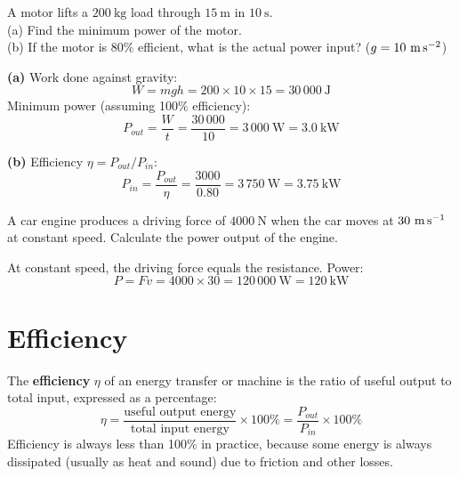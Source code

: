 \begin{examplebox}[5.5]
A motor lifts a $200\ \text{kg}$ load through
$15\ \text{m}$ in $10\ \text{s}$.\\
(a) Find the minimum power of the motor.\\
(b) If the motor is $80\%$ efficient, what is the
actual power input?
($g = 10\ \text{m\,s}^{-2}$)
\end{examplebox}

\begin{solutionbox}
\textbf{(a)} Work done against gravity:
\[
  W = mgh = 200 \times 10 \times 15 = 30\,000\ \text{J}
\]
Minimum power (assuming 100\% efficiency):
\[
  P_{out} = \frac{W}{t} = \frac{30\,000}{10}
  = 3\,000\ \text{W} = 3.0\ \text{kW}
\]

\textbf{(b)} Efficiency $\eta = P_{out}/P_{in}$:
\[
  P_{in} = \frac{P_{out}}{\eta}
  = \frac{3000}{0.80} = 3\,750\ \text{W} = 3.75\ \text{kW}
\]
\end{solutionbox}

\begin{examplebox}[5.6]
A car engine produces a driving force of $4000\ \text{N}$
when the car moves at $30\ \text{m\,s}^{-1}$ at constant
speed. Calculate the power output of the engine.
\end{examplebox}

\begin{solutionbox}
At constant speed, the driving force equals the
resistance. Power:
\[
  P = Fv = 4000 \times 30 = 120\,000\ \text{W}
  = 120\ \text{kW}
\]
\end{solutionbox}

\section{Efficiency}

\begin{definitionbox}[Efficiency]
The \textbf{efficiency} $\eta$ of an energy transfer
or machine is the ratio of useful output to total input,
expressed as a percentage:
\[
  \eta = \frac{\text{useful output energy}}
  {\text{total input energy}} \times 100\%
  = \frac{P_{out}}{P_{in}} \times 100\%
\]
Efficiency is always less than 100\% in practice,
because some energy is always dissipated (usually
as heat and sound) due to friction and other losses.
\end{definitionbox}

